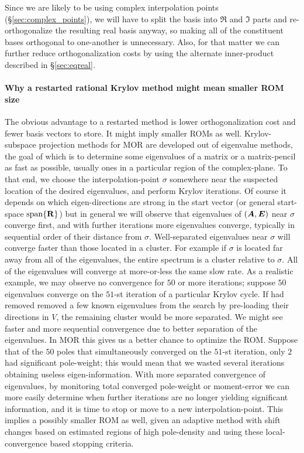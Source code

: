  Since we are likely to be using complex interpolation points (\S\ref{sec:complex_points}), we will have to split the basis into $\Re$ and $\Im$ parts and re-orthogonalize the resulting real basis anyway, so making all of the constituent bases orthogonal to one-another is unnecessary.    Also, for that matter we can further reduce orthogonalization costs by using the alternate inner-product described in \S\ref{sec:eqreal}.

\paragraph{Why a restarted rational Krylov method might mean smaller ROM size}
The obvious advantage to a restarted method is lower orthogonalization cost and fewer basis vectors to store.  It might imply smaller ROMs as well.
Krylov-subspace projection methods for MOR are developed out of eigenvalue methods, the goal of which  is to determine some eigenvalues of a matrix or a matrix-pencil as fast as possible, usually ones in a particular region of the complex-plane.   To that end, we choose the interpolation-point $\sigma$ somewhere near the suspected location of the desired eigenvalues, and perform Krylov iterations.  Of course it depends on which eigen-directions are strong in the start vector (or general start-space $\operatorname*{span} \{\textbf{\textup{R}}\}$) but in general we will observe that eigenvalues of $(\bm{A},\bm{E})$ near $\sigma$ converge first, and with further iterations more eigenvalues converge, typically in sequential order of their distance from $\sigma$.   Well-separated eigenvalues near $\sigma$ will converge faster than those located in a cluster.   For example if $\sigma$ is located far away from all of the eigenvalues, the entire spectrum is a cluster relative to $\sigma$.  All of the eigenvalues  will converge at more-or-less the same slow rate.  As a realistic example, we may observe no convergence for $50$ or more iterations; suppose $50$  eigenvalues converge on the $51$-st iteration of a particular Krylov cycle.      If had removed removed a few  known eigenvalues from the search by pre-loading their directions in $V$, the remaining cluster would be more separated.  We might see faster and more sequential convergence due to better separation of the eigenvalues.  In MOR this gives us a better chance to optimize the ROM.  Suppose that of the $50$ poles that simultaneously converged on the $51$-st  iteration,  only $2$ had significant pole-weight; this would mean that we wasted several iterations obtaining useless eigen-information.  With more separated convergence of eigenvalues,  by monitoring total converged pole-weight or moment-error we can more easily determine when further iterations are no longer yielding significant information, and it is time to stop or move to a new interpolation-point.   This implies a possibly smaller ROM as well, given an adaptive method with shift changes based on estimated regions of high pole-density and using these local-convergence based stopping criteria.

